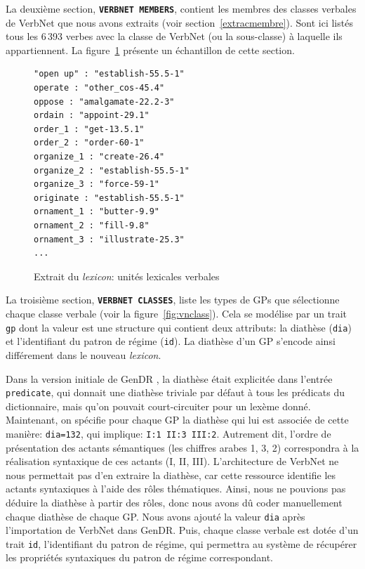 La deuxième section, \textbf{\texttt{VERBNET MEMBERS}}, contient les membres des classes verbales de VerbNet que nous avons extraits (voir section~\ref{extracmembre}). Sont ici listés tous les 6\,393 verbes avec la classe de VerbNet (ou la sous-classe) à laquelle ils appartiennent. La figure~\ref{fig:extraituniteslexicales} présente un échantillon de cette section.

\begin{figure}[htb]
\begin{lstlisting}[language=mate]
"open up" : "establish-55.5-1"
operate : "other_cos-45.4"
oppose : "amalgamate-22.2-3"
ordain : "appoint-29.1"
order_1 : "get-13.5.1"
order_2 : "order-60-1"
organize_1 : "create-26.4"
organize_2 : "establish-55.5-1"
organize_3 : "force-59-1"
originate : "establish-55.5-1"
ornament_1 : "butter-9.9"
ornament_2 : "fill-9.8"
ornament_3 : "illustrate-25.3"
...
\end{lstlisting}
  \caption{Extrait du \emph{lexicon}: unités lexicales verbales}
	\label{fig:extraituniteslexicales}
\end{figure}

La troisième section, \textbf{\texttt{VERBNET CLASSES}}, liste les types de \acp{GP} que sélectionne chaque classe verbale (voir la figure~\ref{fig:vnclass}). Cela se modélise par un trait \texttt{gp} dont la valeur est une structure qui contient deux attributs: la diathèse (\texttt{dia}) et l'identifiant du patron de régime (\texttt{id}). La diathèse d'un \ac{GP} s'encode ainsi différement dans le nouveau \emph{lexicon}. 

Dans la version initiale de GenDR \citep{lareau18}, la diathèse était explicitée dans l'entrée \texttt{predicate}, qui donnait une diathèse triviale par défaut à tous les prédicats du dictionnaire, mais qu'on pouvait court-circuiter pour un lexème donné. Maintenant, on spécifie pour chaque \ac{GP} la diathèse qui lui est associée de cette manière: \texttt{dia=132}, qui implique: \texttt{I:1 II:3 III:2}. Autrement dit, l'ordre de présentation des actants sémantiques (les chiffres arabes 1, 3, 2) correspondra à la réalisation syntaxique de ces actants (I, II, III). L'architecture de VerbNet ne nous permettait pas d'en extraire la diathèse, car cette ressource identifie les actants syntaxiques à l'aide des rôles thématiques. Ainsi, nous ne pouvions pas déduire la diathèse à partir des rôles, donc nous avons dû coder manuellement chaque diathèse de chaque \ac{GP}. Nous avons ajouté la valeur \texttt{dia} après l'importation de VerbNet dans GenDR. Puis, chaque classe verbale est dotée d'un trait \texttt{id}, l'identifiant du patron de régime, qui permettra au système de récupérer les propriétés syntaxiques du patron de régime correspondant.

